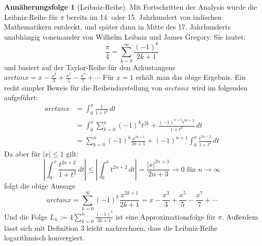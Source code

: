 \documentclass{scrartcl}
\theoremstyle{definition}
\newtheorem{approximation sequence}{Annäherungsfolge}
\begin{document}
\begin{approximation sequence}[Leibniz-Reihe]
Mit Fortschritten der Analysis wurde die Leibniz-Reihe für \(\pi\) bereits im
14. oder 15. Jahrhundert von indischen Mathematikern entdeckt, und später dann
in Mitte des 17. Jahrhunderts unabhängig voneinander von Wilhelm Leibniz und
James Gregory. Sie lautet:
\[ \frac{\pi}{4} = \sum_{k=0}^{\infty} \frac{(-1)^k}{2k+1} \]
und basiert auf der Taylor-Reihe für den Arkustangens \(arctanx = x -
   \frac{x^3}{3} + \frac{x^5}{5} - \frac{x^7}{7} + \cdots \) Für \(x = 1\)
   erhält man das obige Ergebnis. Ein recht simpler Beweis für die
   Reihendarstellung von \(arctanx\) wird im folgenden aufgeführt:
   \cite{Leibniz}
\begin{equation}
    \begin{split}
        arctanx & = \int_{0}^{x} \frac{1}{1+t^2}\,dt                                                              \\
                & = \int_{0}^{x}\sum_{k=0}^{n}(-1)^k t^{2k} + \frac{(-1)^{n+1}t^{2n+2}}{1+t^2}\,dt                \\
                & = \sum_{k=0}^{n}(-1)^k \frac{x^{2k+1}}{2k+1} + (-1)^{n+1}\int_{0}^{x}\frac{t^{2n+2}}{1+t^2}\,dt
    \end{split}
\end{equation}
Da aber für \(|x| \leqslant 1\) gilt: \[|\int_{0}^{x}\frac{t^{2n+2}}{1+t^2}\,dt| \leqslant |\int_{0}^{x}t^{2n+2}\,dt| = \frac{|x|^{2n+3}}{2n+3} \rightarrow 0 \text{ für } n \rightarrow \infty \]
folgt die obige Aussage
\[arctanx = \sum_{k=0}^{\infty}(-1)^k \frac{x^{2k+1}}{2k+1} = x - \frac{x^3}{3} + \frac{x^5}{5} - \frac{x^7}{7} + \cdots \]
Und die Folge \(L_n := 4\sum_{k=0}^{n} \frac{(-1)^k}{2k+1} \) ist eine
   Approximationsfolge für \(\pi\). Außerdem lässt sich mit Definition 3 leicht
   nachrechnen, dass die Leibniz-Reihe logarithmisch konvergiert.
\end{approximation sequence}
\end{document}
